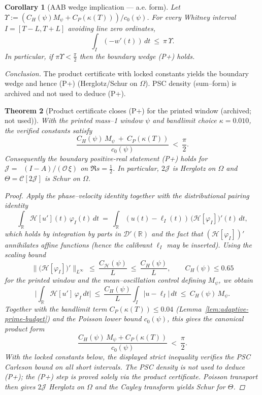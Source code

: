 \documentclass[11pt]{article}
\providecommand{\CPstar}{0.04}%
\newtheorem{theorem}{Theorem}
\newtheorem{corollary}[theorem]{Corollary}
\theoremstyle{definition}
\theoremstyle{remark}
\newcommand{\R}{\mathbb{R}}
\DeclareMathOperator{\dettwo}{det_2}
\begin{document}
\begin{corollary}[AAB wedge implication — a.e. form]\label{cor:two-line-wedge}
Let $\Upsilon:=(C_H(\psi)M_\psi+C_P(\kappa(T)))/c_0(\psi)$. For every Whitney interval $I=[T-L,T+L]$ avoiding line zero ordinates,
\[
  \int_I (-w'(t))\,dt\ \le\ \pi\,\Upsilon.
\]
In particular, if $\pi\Upsilon<\tfrac{\pi}{2}$ then the boundary wedge \emph{(P+)} holds.
\end{corollary}
\medskip
\noindent\emph{Conclusion.}
The product certificate with locked constants yields the boundary wedge and hence \textup{(P+)} (Herglotz/Schur on $\Omega$). PSC density (sum--form) is archived and not used to deduce (P+).
\begin{theorem}[Product certificate closes (P+) for the printed window (archived; not used)]\label{thm:certificate-inpaper}
With the printed mass--1 window $\psi$ and bandlimit choice $\kappa=0.010$, the verified constants satisfy
\[
  \frac{C_H(\psi)\,M_\psi\ +\ C_P(\kappa(T))}{\,c_0(\psi)\,}\ <\ \frac{\pi}{2}.
\]
Consequently the boundary positive-real statement \emph{(P+)} holds for $\mathcal J=\dettwo(I-A)/(\mathcal O\,\xi)$ on $\Re s=\tfrac12$. In particular, $2\mathcal J$ is Herglotz on $\Omega$ and $\Theta=\mathcal C[2\mathcal J]$ is Schur on $\Omega$.
\begin{proof}
Apply the phase--velocity identity together with the distributional pairing identity
\[
  \int_\R \mathcal H[u'](t)\,\varphi_I(t)\,dt\ =\ \int_\R (u(t)-\ell_I(t))\,\big(\mathcal H[\varphi_I]\big)'(t)\,dt,
\]
which holds by integration by parts in $\mathcal D'(\R)$ and the fact that $(\mathcal H[\varphi_I])'$ annihilates affine functions (hence the calibrant $\ell_I$ may be inserted). Using the scaling bound
\[
  \big\|\big(\mathcal H[\varphi_I]\big)'\big\|_{L^\infty}\ \le\ \frac{C_{\mathcal H}(\psi)}{L}\ \le\ \frac{C_H(\psi)}{L},\qquad C_H(\psi)\le 0.65
\]
for the printed window and the mean--oscillation control defining $M_\psi$, we obtain
\[
  \Big|\int_\R \mathcal H[u']\,\varphi_I\,dt\Big|\ \le\ \frac{C_H(\psi)}{L}\int_I |u-\ell_I|\,dt\ \le\ C_H(\psi)\,M_\psi.
\]
Together with the bandlimit term $C_P(\kappa(T))\le \CPstar$ (Lemma~\ref{lem:adaptive-prime-budget}) and the Poisson lower bound $c_0(\psi)$, this gives the canonical product form
\[
  \frac{C_H(\psi)\,M_\psi + C_P(\kappa(T))}{c_0(\psi)}\ <\ \frac{\pi}{2}.
\]
With the locked constants below, the displayed strict inequality verifies the PSC Carleson bound on all short intervals. The PSC density is not used to deduce (P+); the (P+) step is proved solely via the product certificate. Poisson transport then gives $2\mathcal J$ Herglotz on $\Omega$ and the Cayley transform yields Schur for $\Theta$.
\end{proof}
\end{theorem}
\end{document}
